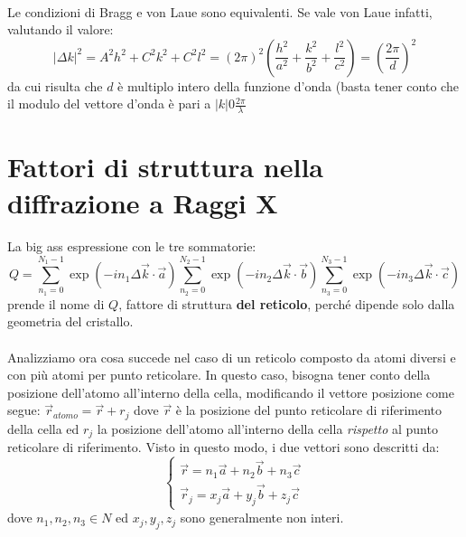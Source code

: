 \documentclass{book}
\begin{document}
                    \paragraph{}
                        Le condizioni di Bragg e von Laue sono equivalenti. Se vale von Laue infatti, valutando il valore:
                        $$|\Delta k| ^{2} = A^{2}h^{2}+C^{2}k^{2}+C^{2}l^{2} = (2\pi)^{2} (\frac{h^{2}}{a^{2}}+\frac{k^{2}}{b^{2}}+\frac{l^{2}}{c^{2}}) = (\frac{2 \pi}{d})^{2}$$
                        da cui risulta che $d$ è multiplo intero della funzione d'onda (basta tener conto che il modulo del vettore d'onda è pari a $|k| 0 \frac{2\pi}{\lambda}$

    \section{Fattori di struttura nella diffrazione a Raggi X}
        \paragraph{} La big ass espressione con le tre sommatorie:
        $$Q = \sum_{n_{1} = 0} ^{N_{1} -1}\exp{(-in_{1}\Delta\vec{k} \cdot \vec{a})}\sum_{n_{2} = 0} ^{N_{2} -1}\exp{(-in_{2}\Delta\vec{k} \cdot \vec{b})}\sum_{n_{3} = 0} ^{N_{3} -1}\exp{(-in_{3}\Delta\vec{k} \cdot \vec{c})}$$
        prende il nome di $Q$, fattore di struttura \textbf{del reticolo}, perché dipende solo dalla geometria del cristallo.

        \paragraph{} Analizziamo ora cosa succede nel caso di un reticolo composto da atomi diversi e con più atomi per punto reticolare. In questo caso, bisogna tener conto della posizione dell'atomo all'interno della cella, modificando il vettore posizione come segue:
        $\vec{r}_{atomo} = \vec{r}+r_{j}$
        dove $\vec{r}$ è la posizione del punto reticolare di riferimento della cella ed $r_{j}$ la posizione dell'atomo all'interno della cella \textit{rispetto} al punto reticolare di riferimento. Visto in questo modo, i due vettori sono descritti da:
       $$ \begin{cases}
            \vec{r} = n_{1}\vec{a}+n_{2}\vec{b}+n_{3}\vec{c} \\
            \vec{r}_{j} = x_{j}\vec{a}+y_{j}\vec{b}+z_{j}\vec{c}
         \end{cases}$$
         dove $n_{1},n_{2},n_{3} \in N$ ed $x_{j},y_{j},z_{j}$ sono generalmente non interi.
\end{document}

